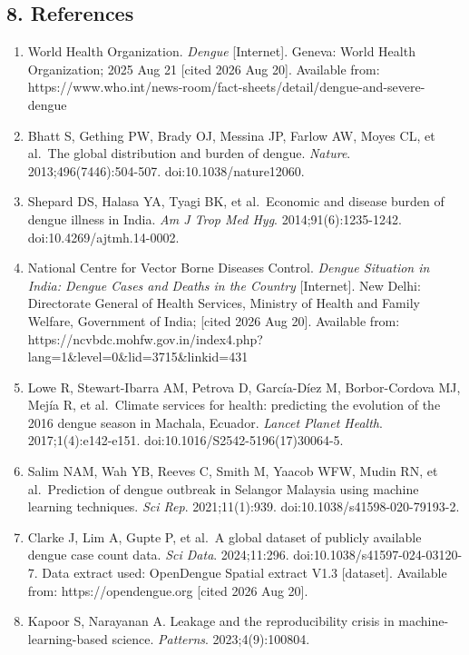 \documentclass[
  10pt,
  twocolumn]{article}
\begin{document}
\subsection{8. References}\label{references}

\begin{enumerate}
\def\labelenumi{\arabic{enumi}.}
\item
  World Health Organization. \emph{Dengue} {[}Internet{]}. Geneva: World
  Health Organization; 2025 Aug 21 {[}cited 2026 Aug 20{]}. Available
  from:
  https://www.who.int/news-room/fact-sheets/detail/dengue-and-severe-dengue
\item
  Bhatt S, Gething PW, Brady OJ, Messina JP, Farlow AW, Moyes CL, et
  al.~The global distribution and burden of dengue. \emph{Nature}.
  2013;496(7446):504-507. doi:10.1038/nature12060.
\item
  Shepard DS, Halasa YA, Tyagi BK, et al.~Economic and disease burden of
  dengue illness in India. \emph{Am J Trop Med Hyg}.
  2014;91(6):1235-1242. doi:10.4269/ajtmh.14-0002.
\item
  National Centre for Vector Borne Diseases Control. \emph{Dengue
  Situation in India: Dengue Cases and Deaths in the Country}
  {[}Internet{]}. New Delhi: Directorate General of Health Services,
  Ministry of Health and Family Welfare, Government of India; {[}cited
  2026 Aug 20{]}. Available from:
  https://ncvbdc.mohfw.gov.in/index4.php?lang=1\&level=0\&lid=3715\&linkid=431
\item
  Lowe R, Stewart-Ibarra AM, Petrova D, García-Díez M, Borbor-Cordova
  MJ, Mejía R, et al.~Climate services for health: predicting the
  evolution of the 2016 dengue season in Machala, Ecuador. \emph{Lancet
  Planet Health}. 2017;1(4):e142-e151.
  doi:10.1016/S2542-5196(17)30064-5.
\item
  Salim NAM, Wah YB, Reeves C, Smith M, Yaacob WFW, Mudin RN, et
  al.~Prediction of dengue outbreak in Selangor Malaysia using machine
  learning techniques. \emph{Sci Rep}. 2021;11(1):939.
  doi:10.1038/s41598-020-79193-2.
\item
  Clarke J, Lim A, Gupte P, et al.~A global dataset of publicly
  available dengue case count data. \emph{Sci Data}. 2024;11:296.
  doi:10.1038/s41597-024-03120-7. Data extract used: OpenDengue Spatial
  extract V1.3 {[}dataset{]}. Available from: https://opendengue.org
  {[}cited 2026 Aug 20{]}.
\item
  Kapoor S, Narayanan A. Leakage and the reproducibility crisis in
  machine-learning-based science. \emph{Patterns}. 2023;4(9):100804.

\end{enumerate}
\end{document}
